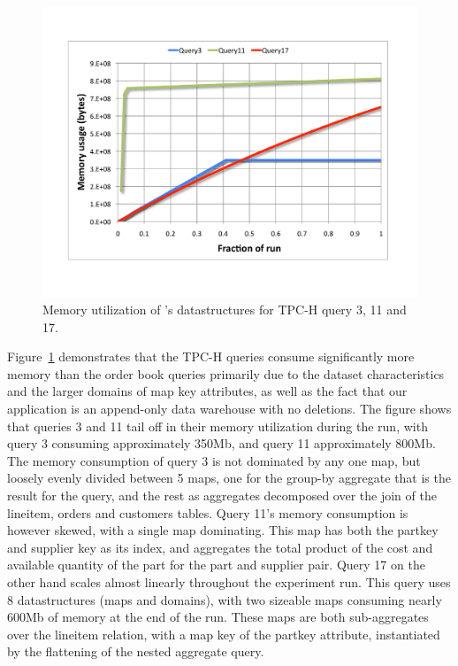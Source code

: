 \begin{figure}[htbp]
\includegraphics[scale=0.33]{figures/tpch-mem}
\caption{Memory utilization of \compiler's datastructures for TPC-H query 3, 11
  and 17.}
\label{fig:tpchmem}
\end{figure}

Figure~\ref{fig:tpchmem} demonstrates that the TPC-H queries consume
significantly more memory than the order book queries primarily due to the
dataset characteristics and the larger domains of map key attributes, as well as
the fact that our application is an append-only data warehouse with no
deletions. The figure shows that queries 3 and 11 tail off in their memory
utilization during the run, with query 3 consuming approximately 350Mb, and
query 11 approximately 800Mb. The memory consumption of query 3 is not dominated
by any one map, but loosely evenly divided between 5 maps, one for the group-by
aggregate that is the result for the query, and the rest as aggregates
decomposed over the join of the lineitem, orders and customers tables. Query
11's memory consumption is however skewed, with a single map dominating. This
map has both the partkey and supplier key as its index, and aggregates the total
product of the cost and available quantity of the part for the part and supplier
pair. Query 17 on the other hand scales almost linearly throughout the
experiment run. This query uses 8 datastructures (maps and domains), with two
sizeable maps consuming nearly 600Mb of memory at the end of the run. These maps
are both sub-aggregates over the lineitem relation, with a map key of the
partkey attribute, instantiated by the flattening of the nested aggregate query.

